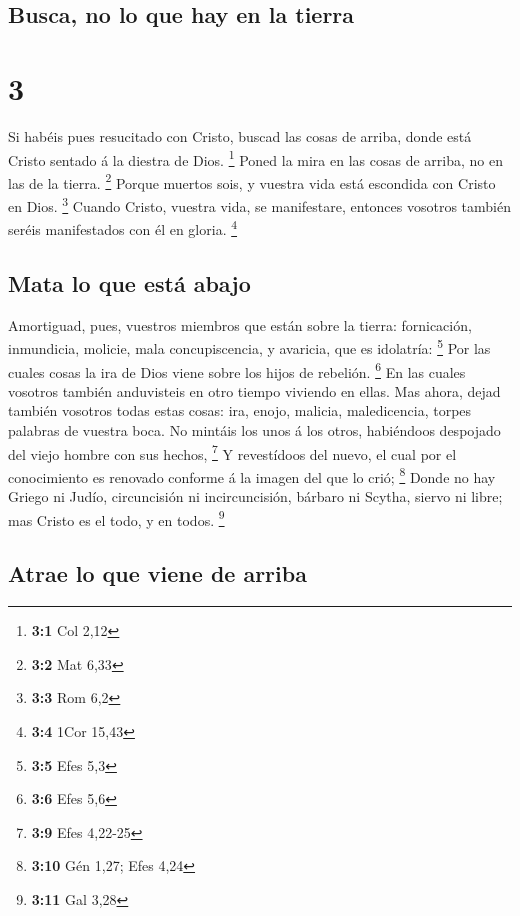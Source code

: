 \hypertarget{busca-no-lo-que-hay-en-la-tierra}{%
\subsection{Busca, no lo que hay en la
tierra}\label{busca-no-lo-que-hay-en-la-tierra}}

\hypertarget{section-2}{%
\section{3}\label{section-2}}

 Si habéis pues resucitado con Cristo, buscad las cosas de
arriba, donde está Cristo sentado á la diestra de Dios. \footnote{\textbf{3:1}
  Col 2,12}  Poned la mira en las cosas de arriba, no en las
de la tierra. \footnote{\textbf{3:2} Mat 6,33}  Porque
muertos sois, y vuestra vida está escondida con Cristo en Dios.
\footnote{\textbf{3:3} Rom 6,2}  Cuando Cristo, vuestra
vida, se manifestare, entonces vosotros también seréis manifestados con
él en gloria. \footnote{\textbf{3:4} 1Cor 15,43}

\hypertarget{mata-lo-que-estuxe1-abajo}{%
\subsection{Mata lo que está abajo}\label{mata-lo-que-estuxe1-abajo}}

 Amortiguad, pues, vuestros miembros que están sobre la
tierra: fornicación, inmundicia, molicie, mala concupiscencia, y
avaricia, que es idolatría: \footnote{\textbf{3:5} Efes 5,3}
 Por las cuales cosas la ira de Dios viene sobre los hijos
de rebelión. \footnote{\textbf{3:6} Efes 5,6}  En las cuales
vosotros también anduvisteis en otro tiempo viviendo en ellas.
 Mas ahora, dejad también vosotros todas estas cosas: ira,
enojo, malicia, maledicencia, torpes palabras de vuestra boca.
 No mintáis los unos á los otros, habiéndoos despojado del
viejo hombre con sus hechos, \footnote{\textbf{3:9} Efes 4,22-25}
 Y revestídoos del nuevo, el cual por el conocimiento es
renovado conforme á la imagen del que lo crió; \footnote{\textbf{3:10}
  Gén 1,27; Efes 4,24}  Donde no hay Griego ni Judío,
circuncisión ni incircuncisión, bárbaro ni Scytha, siervo ni libre; mas
Cristo es el todo, y en todos. \footnote{\textbf{3:11} Gal 3,28}

\hypertarget{atrae-lo-que-viene-de-arriba}{%
\subsection{Atrae lo que viene de
arriba}\label{atrae-lo-que-viene-de-arriba}}

